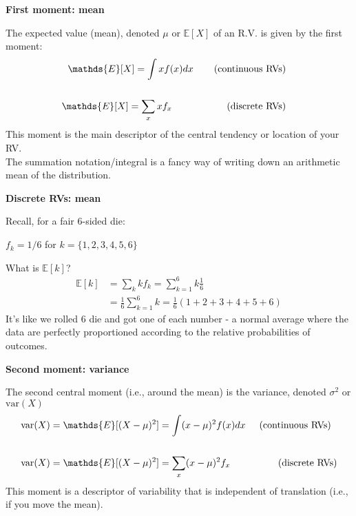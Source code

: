\documentclass[12pt,xcolor=svgnames]{beamer}
\newcommand{\bl}{\color{blue}}
\newcommand{\theme}{\color{FireBrick}}
\newcommand{\ds}[1]{\mathds{#1}}
\newcommand{\sk}{\vspace{.4cm}}
\newcommand{\chap}[1]{{\theme \Large \bf #1} \sk}
\newcommand{\E}{\ds{E}}
\newcommand{\var}{\text{var}}
\begin{document}
\begin{frame}
\chap{First moment: {\bf mean} }

The expected value (mean), denoted $\mu$ or $\E[X]$  of an R.V. is given by the first moment:
\begin{align*}
\E[X] = \int x f(x) dx \text{\hspace{0.75cm}(continuous RVs)}\\
& \\
\E[X] = \sum_x x f_x \text{\hspace{2cm}(discrete RVs)}
\end{align*}
This moment is the main descriptor of the central tendency or location of your RV. \\
\sk
{\tiny The summation notation/integral is a fancy way of writing down an arithmetic mean of the distribution.}

\end{frame}


\begin{frame}
\chap{Discrete RVs: mean}

Recall, for a fair 6-sided die:

$f_k = 1/6$ for $k= \{1,2,3,4,5,6\}$

\sk
What is $\E[k]$?
\begin{align*}
\E[k] & = \sum_k k f_k  = \sum_{k=1}^{6} k \frac{1}{6}\\
& = \frac{1}{6}  \sum_{k=1}^{6} k = \frac{1}{6} (1+2+3+4+5+6)
\end{align*}
It's like we rolled 6 die and got one of each number - a normal average where the data are perfectly proportioned according to the relative probabilities of outcomes.

\end{frame}



\begin{frame}
\chap{Second moment: variance}

The second {\bl central} moment (i.e., around the mean) is the variance, denoted $\sigma^2$ or $\var(X)$
\begin{align*}
\var(X) & = \E[(X-\mu)^2] = \int (x-\mu)^2 f(x) dx \text{\hspace{0.5cm}(continuous RVs)}\\
&\\
\var(X) & = \E[(X-\mu)^2] = \sum_x (x-\mu)^2 f_x \text{\hspace{1.75cm}(discrete RVs)}
\end{align*}
This moment is a descriptor of variability that is independent of translation (i.e., if you move the mean). 

\end{frame}
\end{document}
